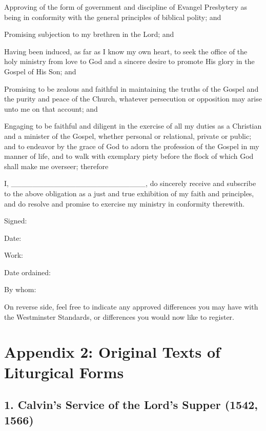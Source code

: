 \documentclass[
]{book}
\begin{document}
Approving of the form of government and discipline of Evangel Presbytery as being in conformity with the general principles of biblical polity; and

Promising subjection to my brethren in the Lord; and

Having been induced, as far as I know my own heart, to seek the office of the holy ministry from love to God and a sincere desire to promote His glory in the Gospel of His Son; and

Promising to be zealous and faithful in maintaining the truths of the Gospel and the purity and peace of the Church, whatever persecution or opposition may arise unto me on that account; and

Engaging to be faithful and diligent in the exercise of all my duties as a Christian and a minister of the Gospel, whether personal or relational, private or public; and to endeavor by the grace of God to adorn the profession of the Gospel in my manner of life, and to walk with exemplary piety before the flock of which God shall make me overseer; therefore

I, \_\_\_\_\_\_\_\_\_\_\_\_\_\_\_\_\_\_\_\_\_\_\_\_\_, do sincerely receive and subscribe to the above obligation as a just and true exhibition of my faith and principles, and do resolve and promise to exercise my ministry in conformity therewith.

Signed:

Date:

Work:

Date ordained:

By whom:

On reverse side, feel free to indicate any approved differences you may have with the Westminster Standards, or differences you would now like to register.

\hypertarget{appendix-2-original-texts-of-liturgical-forms}{%
\chapter*{Appendix 2: Original Texts of Liturgical Forms}\label{appendix-2-original-texts-of-liturgical-forms}}

\hypertarget{calvins-service-of-the-lords-supper-1542-1566}{%
\section*{1. Calvin's Service of the Lord's Supper (1542, 1566)}\label{calvins-service-of-the-lords-supper-1542-1566}}
\end{document}
